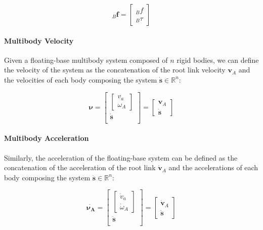 \begin{equation}
    {}_{B}\mathbf{f} = \begin{bmatrix}
        {}_{B}f \\
        {}_{B}\tau
    \end{bmatrix}
\end{equation}

\paragraph{Multibody Velocity} Given a floating-base multibody system composed of $n$ rigid bodies, we can define the velocity of the system as the concatenation of the root link  velocity $\mathbf{v}_A$ and the velocities of each body composing the system $\dot{\mathbf{s}} \in \mathbb{R} ^{n}$:

\begin{equation}
    \boldsymbol{\nu} = \begin{bmatrix}
        \begin{bmatrix} v _a \\ \omega _A \end{bmatrix} \\
        \dot{\mathbf{s}}                                \\
    \end{bmatrix} = \begin{bmatrix}
        \mathbf{v}_A \\
        \dot{\mathbf{s}}
    \end{bmatrix}
\end{equation}

\paragraph{Multibody Acceleration} Similarly, the acceleration of the floating-base system can be defined as the concatenation of the acceleration of the root link $\dot{\mathbf{v}} _A$ and the accelerations of each body composing the system $\ddot{\mathbf{s}} \in \mathbb{R} ^{n}$:

\begin{equation}
    \dot{\boldsymbol{\nu _A}} = \begin{bmatrix}
        \begin{bmatrix} \dot{v} _a \\ \dot{\omega} _A \end{bmatrix} \\
        \ddot{\mathbf{s}}                                           \\
    \end{bmatrix} = \begin{bmatrix}
        \dot{\mathbf{v}}_A \\
        \ddot{\mathbf{s}}
    \end{bmatrix}
\end{equation}

